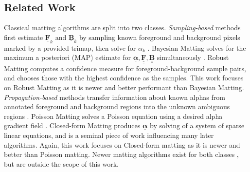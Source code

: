 \documentclass{article}
\theoremstyle{definition}
\def\vt#1{\underline{\mathbf{#1}}}
\def\vts#1{\underline{\boldsymbol{#1}}}
\def\mt#1{\underline{\underline{\mathbf{#1}}}}
\begin{document}
\begin{multicols}{2}[]




\section{Related Work}

Classical matting algorithms are split into two classes. \emph{Sampling-based} methods first estimate $\vt F_k$ and $\vt B_k$ by sampling known foreground and background pixels marked by a provided trimap, then solve for $\alpha_k$ \cite{dim-paper}. Bayesian Matting solves for the maximum a posteriori (MAP) estimate for $\vts \alpha,\mt F,\mt B$ simultaneously \cite{bayesian-matting}. Robust Matting computes a confidence measure for foreground-background sample pairs, and chooses those with the highest confidence as the samples. This work focuses on Robust Matting as it is newer and better performant than Bayesian Matting. \emph{Propagation-based} methods transfer information about known alphas from annotated foreground and background regions into the unknown ambiguous regions \cite{dim-paper}. Poisson Matting solves a Poisson equation using a desired alpha gradient field \cite{poisson-matting}. Closed-form Matting produces $\vts \alpha$ by solving of a system of sparse linear equations, and is a seminal piece of work influencing many later algorithms. Again, this work focuses on Closed-form matting as it is newer and better than Poisson matting. Newer matting algorithms exist for both classes \cite{closed-form-survey}, but are outside the scope of this work.  %


\end{multicols}
\end{document}
